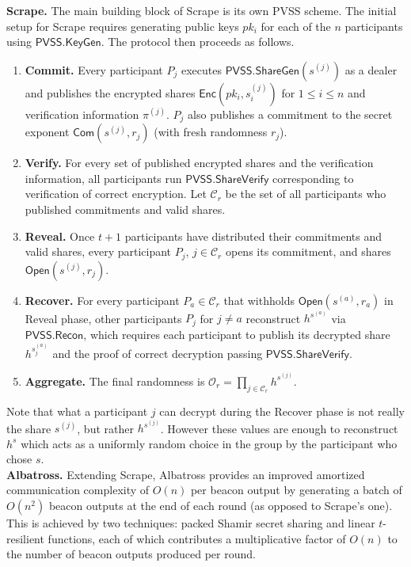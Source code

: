 \documentclass[letterpaper,twocolumn,10pt]{article}
\theoremstyle{definition}
\theoremstyle{remark}
\begin{document}
\noindent\textbf{Scrape.} The main building block of Scrape is its own PVSS scheme. The initial setup for Scrape requires generating public keys $pk_i$ for each of the $n$ participants using $\mathsf{PVSS.KeyGen}$. The protocol then proceeds as follows.
\begin{enumerate}
\item \textbf{Commit.} Every participant $P_j$ executes $\mathsf{PVSS.ShareGen}(s^{(j)})$ as a dealer and publishes the encrypted shares $\mathsf{Enc}(pk_i, s^{(j)}_i)$ for $1 \le i \le n$ and verification information $\pi^{(j)}$. $P_j$ also publishes a commitment to the secret exponent $\mathsf{Com}(s^{(j)}, r_j)$ (with fresh randomness $r_j$).
\item \textbf{Verify.} For every set of published encrypted shares and the verification information, all participants run $\mathsf{PVSS.ShareVerify}$ corresponding to verification of correct encryption. Let $\mathcal{C}_r$ be the set of all participants who published commitments and valid shares.
\item \textbf{Reveal.} Once $t + 1$ participants have distributed their commitments and valid shares, every participant $P_j$, $j \in \mathcal{C}_r$ opens its commitment, and shares $\mathsf{Open}(s^{(j)}, r_j)$.
\item \textbf{Recover.} For every participant $P_a \in \mathcal{C}_r$ that withholds $\mathsf{Open}(s^{(a)}, r_a)$ in Reveal phase, other participants $P_j$ for $j \neq a$ reconstruct $h^{s^{(a)}}$ via $\mathsf{PVSS.Recon}$, which requires each participant to publish its decrypted share $h^{s_j^{(a)}}$ and the proof of correct decryption passing $\mathsf{PVSS.ShareVerify}$.
\item \textbf{Aggregate.} The final randomness is $\mathcal{O}_r = \prod_{j \in \mathcal{C}_r} h^{s^{(j)}}$.
\end{enumerate}

Note that what a participant $j$ can decrypt during the Recover phase is not really the share $s^{(j)}$, but rather $h^{s^{(j)}}$. However these values are enough to reconstruct $h^s$ which acts as a uniformly random choice in the group by the participant who chose $s$.\\

\noindent\textbf{Albatross.} Extending Scrape, Albatross \cite{cascudo2020albatross} provides an improved amortized communication complexity of $O(n)$ per beacon output by generating a batch of $O(n^2)$ beacon outputs at the end of each round (as opposed to Scrape's one). This is achieved by two techniques: packed Shamir secret sharing and linear $t$-resilient functions, each of which contributes a multiplicative factor of $O(n)$ to the number of beacon outputs produced per round.
\end{document}
